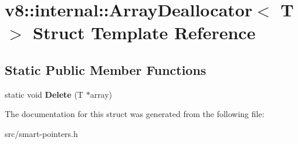\hypertarget{structv8_1_1internal_1_1_array_deallocator}{}\section{v8\+:\+:internal\+:\+:Array\+Deallocator$<$ T $>$ Struct Template Reference}
\label{structv8_1_1internal_1_1_array_deallocator}
\subsection*{Static Public Member Functions}
\begin{DoxyCompactItemize}
\item 
\hypertarget{structv8_1_1internal_1_1_array_deallocator_a9bbfd873370a246a77ec445644ffa058}{}static void {\bfseries Delete} (T $\ast$array)\label{structv8_1_1internal_1_1_array_deallocator_a9bbfd873370a246a77ec445644ffa058}

\end{DoxyCompactItemize}


The documentation for this struct was generated from the following file\+:\begin{DoxyCompactItemize}
\item 
src/smart-\/pointers.\+h\end{DoxyCompactItemize}
